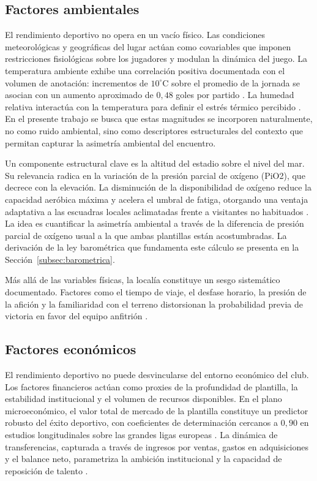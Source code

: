 \subsection{Factores ambientales}

El rendimiento deportivo no opera en un vac\'io f\'isico. Las condiciones meteorol\'ogicas y geogr\'aficas del lugar act\'uan como covariables que imponen restricciones fisiol\'ogicas sobre los jugadores y modulan la din\'amica del juego. La temperatura ambiente exhibe una correlaci\'on positiva documentada con el volumen de anotaci\'on: incrementos de $10^{\circ}\mathrm{C}$ sobre el promedio de la jornada se asocian con un aumento aproximado de $0{,}48$ goles por partido \cite{TemperaturaGoles}. La humedad relativa interact\'ua con la temperatura para definir el estr\'es t\'ermico percibido \cite{Iskandaryan2020}. En el presente trabajo se busca que estas magnitudes se incorporen naturalmente, no como ruido ambiental, sino como descriptores estructurales del contexto que permitan capturar la asimetr\'ia ambiental del encuentro.

Un componente estructural clave es la altitud del estadio sobre el nivel del mar. Su relevancia radica en la variaci\'on de la presi\'on parcial de ox\'igeno (PiO2), que decrece con la elevaci\'on. La disminuci\'on de la disponibilidad de ox\'igeno reduce la capacidad aer\'obica m\'axima y acelera el umbral de fatiga, otorgando una ventaja adaptativa a las escuadras locales aclimatadas frente a visitantes no habituados \cite{West1996}. La idea es cuantificar la asimetr\'ia ambiental a trav\'es de la diferencia de presi\'on parcial de ox\'igeno usual a la que ambas plantillas est\'an acostumbradas. La derivaci\'on de la ley barom\'etrica que fundamenta este c\'alculo se presenta en la Secci\'on~\ref{subsec:barometrica}.

M\'as all\'a de las variables f\'isicas, la local\'ia constituye un sesgo sistem\'atico documentado. Factores como el tiempo de viaje, el desfase horario, la presi\'on de la afici\'on y la familiaridad con el terreno distorsionan la probabilidad previa de victoria en favor del equipo anfitri\'on \cite{Iskandaryan2020}.

\subsection{Factores econ\'omicos}

El rendimiento deportivo no puede desvincularse del entorno econ\'omico del club. Los factores financieros act\'uan como proxies de la profundidad de plantilla, la estabilidad institucional y el volumen de recursos disponibles. En el plano microecon\'omico, el valor total de mercado de la plantilla constituye un predictor robusto del \'exito deportivo, con coeficientes de determinaci\'on cercanos a $0{,}90$ en estudios longitudinales sobre las grandes ligas europeas \cite{SZYMAN1}. La din\'amica de transferencias, capturada a trav\'es de ingresos por ventas, gastos en adquisiciones y el balance neto, parametriza la ambici\'on institucional y la capacidad de reposici\'on de talento \cite{SZYMAN2}.

